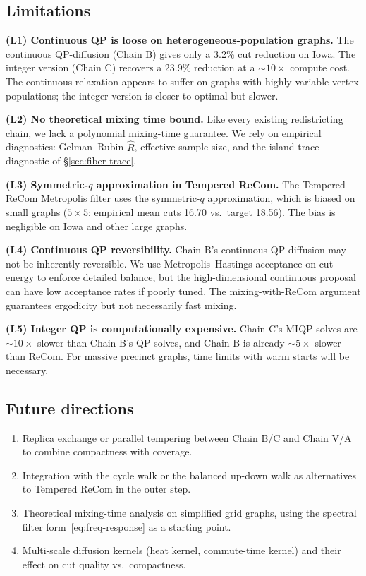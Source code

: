 \documentclass[11pt]{article}
\begin{document}
\subsection{Limitations}\label{sec:disc-limits}

\textbf{(L1) Continuous QP is loose on heterogeneous-population graphs.}
The continuous QP-diffusion (Chain B) gives only a 3.2\% cut reduction
on Iowa. The integer version (Chain C) recovers a 23.9\% reduction at
a $\sim 10\times$ compute cost. The continuous relaxation appears to
suffer on graphs with highly variable vertex populations; the integer
version is closer to optimal but slower.

\textbf{(L2) No theoretical mixing time bound.} Like every existing
redistricting chain, we lack a polynomial mixing-time guarantee.
We rely on empirical diagnostics: Gelman--Rubin $\hat R$, effective
sample size, and the island-trace diagnostic of
\S\ref{sec:fiber-trace}.

\textbf{(L3) Symmetric-$q$ approximation in Tempered ReCom.} The
Tempered ReCom Metropolis filter uses the symmetric-$q$ approximation,
which is biased on small graphs ($5 \times 5$: empirical mean cuts
16.70 vs.\ target 18.56). The bias is negligible on Iowa and other
large graphs.

\textbf{(L4) Continuous QP reversibility.} Chain B's continuous
QP-diffusion may not be inherently reversible. We use Metropolis--Hastings
acceptance on cut energy to enforce detailed balance, but the
high-dimensional continuous proposal can have low acceptance rates if
poorly tuned. The mixing-with-ReCom argument guarantees ergodicity
but not necessarily fast mixing.

\textbf{(L5) Integer QP is computationally expensive.} Chain C's MIQP
solves are $\sim 10\times$ slower than Chain B's QP solves, and Chain
B is already $\sim 5\times$ slower than ReCom. For massive precinct
graphs, time limits with warm starts will be necessary.

\subsection{Future directions}\label{sec:disc-future}

\begin{enumerate}
  \item Replica exchange or parallel tempering between Chain B/C and
    Chain V/A to combine compactness with coverage.
  \item Integration with the cycle walk \cite{deford2025cycle} or the
    balanced up-down walk \cite{akitaya2026bud} as alternatives to
    Tempered ReCom in the outer step.
  \item Theoretical mixing-time analysis on simplified grid graphs,
    using the spectral filter form~\eqref{eq:freq-response} as a
    starting point.
  \item Multi-scale diffusion kernels (heat kernel, commute-time
    kernel) and their effect on cut quality vs.\ compactness.
\end{enumerate}
\end{document}
